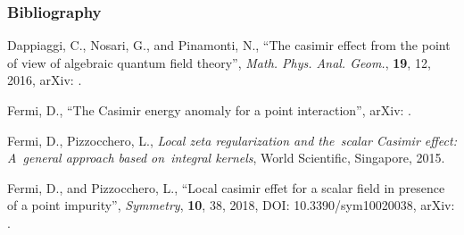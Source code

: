 \documentclass[10pt,t]{beamer}  %
\begin{document}
\begin{frame}
  \frametitle{Bibliography}


  \begin{thebibliography}{99}
    Dappiaggi, C., Nosari, G., and Pinamonti, N., ``The casimir effect
    from the point of view of algebraic quantum field theory'',
    \emph{Math. Phys. Anal. Geom.}, \textbf{19}, 12, 2016, arXiv:
    .

   Fermi,
    D., ``The Casimir energy anomaly for a point interaction'', arXiv:
    .

    Fermi, D., Pizzocchero, L., \emph{Local zeta regularization and
      the~scalar Casimir effect: A~general approach based on~integral
      kernels}, World Scientific, Singapore, 2015.

   Fermi, D.,
    and Pizzocchero, L., ``Local casimir effet for a scalar field in
    presence of a point impurity'', \emph{Symmetry}, \textbf{10}, 38,
    2018, DOI: 10.3390/sym10020038, arXiv:
    .

  \end{thebibliography}

\end{frame}
\end{document}

